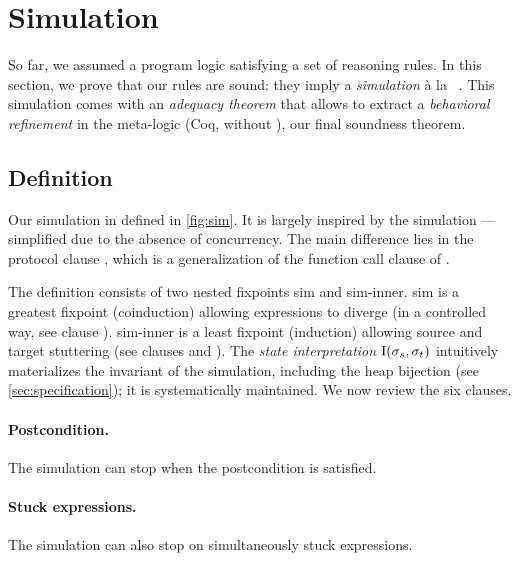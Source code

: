 \section{Simulation}
\label{sec:simulation}

So far, we assumed a program logic satisfying a set of reasoning rules.
In this section, we prove that our rules are sound: they imply a \emph{simulation} à la \Simuliris~\citep*{simuliris-2022}.
This simulation comes with an \emph{adequacy theorem} that allows to extract a \emph{behavioral refinement} in the meta-logic (Coq, without \Iris), our final soundness theorem.

\subsection{Definition}




Our simulation in defined in \cref{fig:sim}.
It is largely inspired by the \Simuliris simulation --- simplified due to the absence of concurrency.
The main difference lies in the protocol clause , which is a generalization of the function call clause of \Simuliris.

\newcommand{\iSimGfp}{\textcolor{\iSimGfpColor}{sim}\xspace}
\newcommand{\iSimLfp}{\textcolor{\iSimLfpColor}{sim-inner}\xspace}

The definition consists of two nested fixpoints \iSimGfp and \iSimLfp.
\iSimGfp is a greatest fixpoint (coinduction) allowing expressions to diverge (in a controlled way, see clause ).
\iSimLfp is a least fixpoint (induction) allowing source and target stuttering (see clauses  and ).
The \emph{state interpretation} $\mathrm{I} (\datalangState_s, \datalangState_t)$ intuitively materializes the invariant of the simulation, including the heap bijection (see \cref{sec:specification}); it is systematically maintained.
We now review the six clauses.

\paragraph{ Postcondition.}
The simulation can stop when the postcondition is satisfied.

\paragraph{ Stuck expressions.}
The simulation can also stop on simultaneously stuck expressions.

